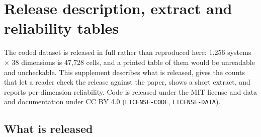 \section{Release description, extract and reliability tables}
\label{app:systems}

The coded dataset is released in full rather than reproduced here: 1,256 systems $\times$
38 dimensions is 47,728 cells, and a printed table of them would be unreadable and
uncheckable. This supplement describes what is released, gives the counts that let a reader check the
release against the paper, shows a short extract, and reports per-dimension reliability. Code is
released under the MIT license and data and documentation under CC BY 4.0
(\texttt{LICENSE-CODE}, \texttt{LICENSE-DATA}).

\subsection{What is released}
\label{subsec:release-files}

